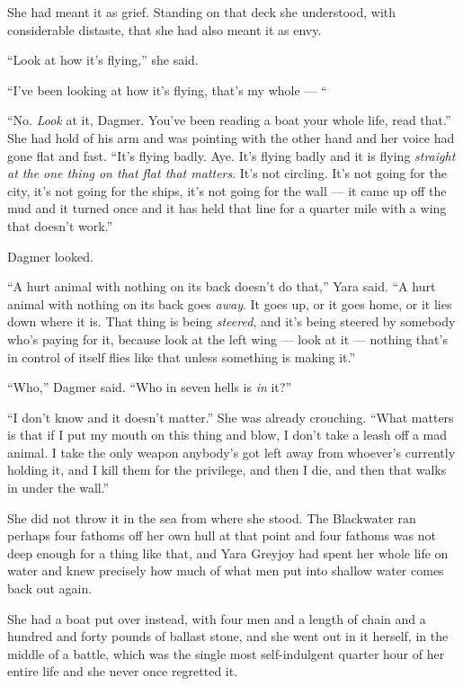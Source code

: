She had meant it as grief. Standing on that deck she understood, with considerable distaste, that she had also meant it as envy.

\sceneBreak

“Look at how it’s flying,” she said.

“I’ve been looking at how it’s flying, that’s my whole — “

“No. \textit{Look} at it, Dagmer. You’ve been reading a boat your whole life, read that.” She had hold of his arm and was pointing with the other hand and her voice had gone flat and fast. “It’s flying badly. Aye. It’s flying badly and it is flying \textit{straight at the one thing on that flat that matters}. It’s not circling. It’s not going for the city, it’s not going for the ships, it’s not going for the wall — it came up off the mud and it turned once and it has held that line for a quarter mile with a wing that doesn’t work.”

Dagmer looked.

“A hurt animal with nothing on its back doesn’t do that,” Yara said. “A hurt animal with nothing on its back goes \textit{away}. It goes up, or it goes home, or it lies down where it is. That thing is being \textit{steered}, and it’s being steered by somebody who’s paying for it, because look at the left wing — look at it — nothing that’s in control of itself flies like that unless something is making it.”

“Who,” Dagmer said. “Who in seven hells is \textit{in} it?”

“I don’t know and it doesn’t matter.” She was already crouching. “What matters is that if I put my mouth on this thing and blow, I don’t take a leash off a mad animal. I take the only weapon anybody’s got left away from whoever’s currently holding it, and I kill them for the privilege, and then I die, and then that walks in under the wall.”

\sceneBreak

She did not throw it in the sea from where she stood. The Blackwater ran perhaps four fathoms off her own hull at that point and four fathoms was not deep enough for a thing like that, and Yara Greyjoy had spent her whole life on water and knew precisely how much of what men put into shallow water comes back out again.

She had a boat put over instead, with four men and a length of chain and a hundred and forty pounds of ballast stone, and she went out in it herself, in the middle of a battle, which was the single most self-indulgent quarter hour of her entire life and she never once regretted it.


